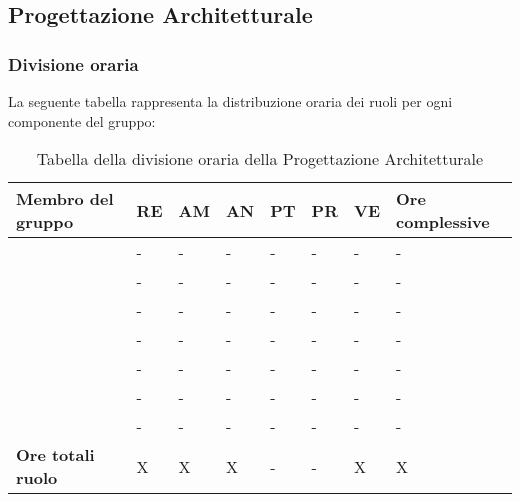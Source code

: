 \subsection{Progettazione Architetturale}

\subsubsection{Divisione oraria}
La seguente tabella rappresenta la distribuzione oraria dei ruoli per ogni componente del gruppo:
{
\renewcommand{\arraystretch}{2}
\begin{longtable}[h!] { C{4cm} C{1cm} C{1cm} C{1cm} C{1cm} C{1cm} C{1cm} C{3cm}}
\caption{Tabella della divisione oraria della Progettazione Architetturale}\\
\rowcolor{\primaryColor}

\textcolor{\secondaryColor}{\textbf{Membro del gruppo}} & 
\textcolor{\secondaryColor}{\textbf{RE}} & 
\textcolor{\secondaryColor}{\textbf{AM}} & 
\textcolor{\secondaryColor}{\textbf{AN}} & 
\textcolor{\secondaryColor}{\textbf{PT}} & 
\textcolor{\secondaryColor}{\textbf{PR}} & 
\textcolor{\secondaryColor}{\textbf{VE}} & 
\textcolor{\secondaryColor}{\textbf{Ore complessive}}\\	
\endhead
        
\AD{}                     &  - &  - &  - & - & - & - & - \\
\AT{}                     &  - &  - &  - & - & - & - & - \\
\AW{}                     &  - &  - &  - & - & - & - & - \\
\EC{}                     &  - &  - &  - & - & - & - & - \\
\EM{}                     &  - &  - &  - & - & - & - & - \\
\FP{}                     &  - &  - &  - & - & - & - & - \\
\GG{}                     &  - &  - &  - & - & - & - & - \\
\textbf{Ore totali ruolo} & X & X & X & - & - & X & X \\

		
\end{longtable}
}

